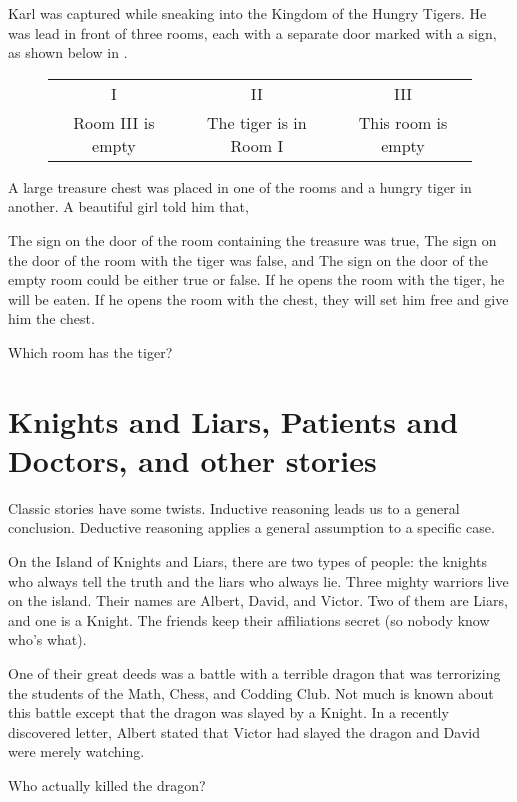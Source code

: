 \documentclass{article}
\begin{document}
\begin{exercise*}
    \label{exercise:pi-2022-4-p9}
    Karl was captured while sneaking into the Kingdom of the Hungry Tigers.
    He was lead in front of three rooms, each with a separate door marked with a sign,
    as shown below in .
    \begin{figure}[h]
        \centering
        \begin{tabular}{|c|c|c|}
        \hline
        I & II & III \\
        Room III is empty & The tiger is in Room I & This room is empty \\ \hline
        \end{tabular}
        \caption{}
        \label{fig:pi-2022-4-p9}
    \end{figure}
    A large treasure chest was placed in one of the rooms and a hungry tiger in another.
    A beautiful girl told him that,
    \begin{enumerate}[topsep=0pt, partopsep=0pt, itemsep=0pt]
        \ii The sign on the door of the room containing the treasure was true,
        \ii The sign on the door of the room with the tiger was false, and
        \ii The sign on the door of the empty room could be either true or false.
        \ii If he opens the room with the tiger, he will be eaten.
        \ii If he opens the room with the chest, they will set him free and give him the chest.
    \end{enumerate}

    Which room has the tiger?
\end{exercise*}

\section*{Knights and Liars, Patients and Doctors, and other stories}

Classic stories have some twists. Inductive reasoning leads us to a general conclusion.
Deductive reasoning applies a general assumption to a specific case.

\begin{example*}
    \label{example:pi-2022-4-p10}
    On the Island of Knights and Liars, there are two types of people:
    the knights who always tell the truth and the liars who always lie.
    Three mighty warriors live on the island.
    Their names are Albert, David, and Victor.
    Two of them are Liars, and one is a Knight.
    The friends keep their affiliations secret (so nobody know who's what).

    One of their great deeds was a battle with a terrible dragon
    that was terrorizing the students of the Math, Chess, and Codding Club.
    Not much is known about this battle except that the dragon was slayed by a Knight.
    In a recently discovered letter, Albert stated that Victor had slayed the dragon
    and David were merely watching.

    Who actually killed the dragon?
\end{example*}
\end{document}
